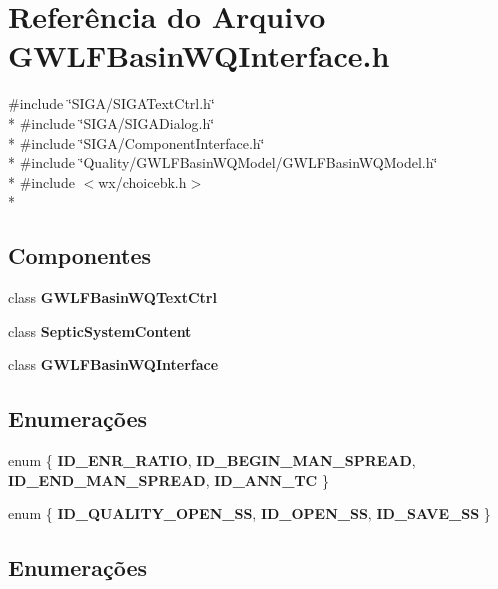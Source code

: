 \section{Referência do Arquivo G\+W\+L\+F\+Basin\+W\+Q\+Interface.\+h}
\label{_g_w_l_f_basin_w_q_interface_8h}
{\ttfamily \#include \char`\"{}S\+I\+G\+A/\+S\+I\+G\+A\+Text\+Ctrl.\+h\char`\"{}}\\*
{\ttfamily \#include \char`\"{}S\+I\+G\+A/\+S\+I\+G\+A\+Dialog.\+h\char`\"{}}\\*
{\ttfamily \#include \char`\"{}S\+I\+G\+A/\+Component\+Interface.\+h\char`\"{}}\\*
{\ttfamily \#include \char`\"{}Quality/\+G\+W\+L\+F\+Basin\+W\+Q\+Model/\+G\+W\+L\+F\+Basin\+W\+Q\+Model.\+h\char`\"{}}\\*
{\ttfamily \#include $<$wx/choicebk.\+h$>$}\\*
\subsection*{Componentes}
\begin{DoxyCompactItemize}
\item 
class {\bf G\+W\+L\+F\+Basin\+W\+Q\+Text\+Ctrl}
\item 
class {\bf Septic\+System\+Content}
\item 
class {\bf G\+W\+L\+F\+Basin\+W\+Q\+Interface}
\end{DoxyCompactItemize}
\subsection*{Enumerações}
\begin{DoxyCompactItemize}
\item 
enum \{ {\bf I\+D\+\_\+\+E\+N\+R\+\_\+\+R\+A\+T\+IO}, 
{\bf I\+D\+\_\+\+B\+E\+G\+I\+N\+\_\+\+M\+A\+N\+\_\+\+S\+P\+R\+E\+AD}, 
{\bf I\+D\+\_\+\+E\+N\+D\+\_\+\+M\+A\+N\+\_\+\+S\+P\+R\+E\+AD}, 
{\bf I\+D\+\_\+\+A\+N\+N\+\_\+\+TC}
 \}
\item 
enum \{ {\bf I\+D\+\_\+\+Q\+U\+A\+L\+I\+T\+Y\+\_\+\+O\+P\+E\+N\+\_\+\+SS}, 
{\bf I\+D\+\_\+\+O\+P\+E\+N\+\_\+\+SS}, 
{\bf I\+D\+\_\+\+S\+A\+V\+E\+\_\+\+SS}
 \}
\end{DoxyCompactItemize}


\subsection{Enumerações}
